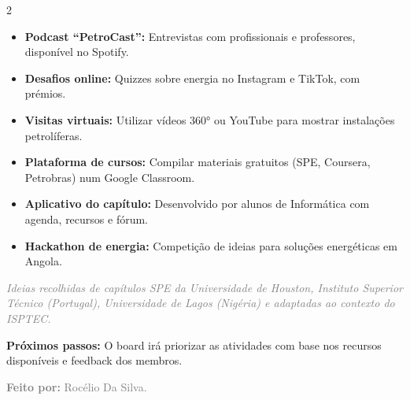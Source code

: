 \documentclass[11pt]{article}
\begin{document}
\begin{multicols}{2}
\begin{tcolorbox}[title={\large\color{spedark}📱 Digitais e Inovação}]
  \begin{itemize}
    \item \textbf{Podcast “PetroCast”:} Entrevistas com profissionais e professores, disponível no Spotify.
    \item \textbf{Desafios online:} Quizzes sobre energia no Instagram e TikTok, com prémios.
    \item \textbf{Visitas virtuais:} Utilizar vídeos 360° ou YouTube para mostrar instalações petrolíferas.
    \item \textbf{Plataforma de cursos:} Compilar materiais gratuitos (SPE, Coursera, Petrobras) num Google Classroom.
    \item \textbf{Aplicativo do capítulo:} Desenvolvido por alunos de Informática com agenda, recursos e fórum.
    \item \textbf{Hackathon de energia:} Competição de ideias para soluções energéticas em Angola.
  \end{itemize}
\end{tcolorbox}

\end{multicols}

\vspace{0.3cm}



\vspace{0.2cm}

\begin{center}
  \footnotesize\textcolor{gray}{\textit{Ideias recolhidas de capítulos SPE da Universidade de Houston, Instituto Superior Técnico (Portugal), Universidade de Lagos (Nigéria) e adaptadas ao contexto do ISPTEC.}}
\end{center}

\vspace{0.1cm}

\begin{center}
  \footnotesize\textcolor{spedark}{\textbf{Próximos passos:} O board irá priorizar as atividades com base nos recursos disponíveis e feedback dos membros.}
\end{center}

\begin{center}
  \footnotesize\textcolor{gray}{\textbf{Feito por:} Rocélio Da Silva.}
\end{center}
\end{document}
